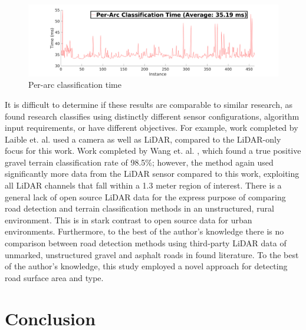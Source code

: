 \documentclass[journal,onecolumn]{IEEEtran}
\begin{document}
		\begin{figure}[H]
			\centering
			\includegraphics[width=0.75\linewidth]{figures/per_arc_classification_time}
			\caption[Per-Arc Time]{Per-arc classification time}
			\label{fig:per_arc_classification_time}
		\end{figure}
		
		{It is difficult to determine if these results are comparable to similar research, as found research classifies using distinctly different sensor configurations,  algorithm input requirements, or have different objectives. For example, work completed by Laible et. al. \cite{levi_3d_2012_light} used a camera as well as LiDAR, compared to the LiDAR-only focus for this work. Work completed by Wang et. al. \cite{wang_road_nodate}, which found a true positive gravel terrain classification rate of 98.5\%; however, the method again used significantly more data from the LiDAR sensor compared to this work, exploiting all LiDAR channels that fall within a 1.3 meter region of interest. There is a general lack of open source LiDAR data for the express purpose of comparing road detection and terrain classification methods in an unstructured, rural environment. This is in stark contrast to open source data for urban environments. Furthermore, to the best of the author's knowledge there is no comparison between road detection methods using third-party LiDAR data of unmarked, unstructured gravel and asphalt roads in found literature. To the best of the author's knowledge, this study employed a novel approach for detecting road surface area and type.}


	
	
	\section{Conclusion}
	
\end{document}
